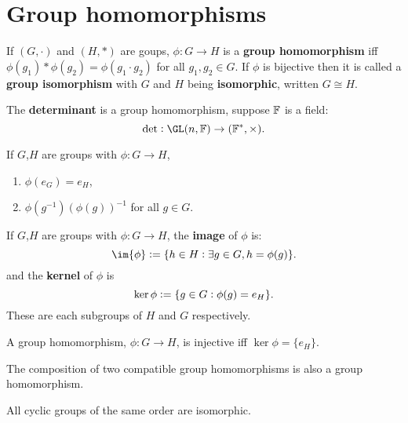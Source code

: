 \section{Group homomorphisms}

\begin{definition}
    If $(G,\cdot)$ and $(H,\ast)$ are goups, $\phi:G\rightarrow H$ is a \textbf{group homomorphism} iff $\phi(g_1)\ast\phi(g_2) = \phi(g_1\cdot g_2)$ for all $g_1,g_2\in G$. If $\phi$ is bijective then it is called a \textbf{group isomorphism} with $G$ and $H$ being \textbf{isomorphic}, written $G\cong H$.
\end{definition}

\begin{example}
    The \textbf{determinant} is a group homomorphism, suppose $\mathbb{F}$ is a field:\[
    \det: \GL(n,\FF)\rightarrow(\FF^*,\times)
    \textcolor{black}{.}
    \]
\end{example}

\begin{lemma}
    If $G$,$H$ are groups with $\phi:G\rightarrow H$, \begin{enumerate}
        \item $\phi(e_G) = e_H$,
        \item $\phi(g^{-1}) (\phi(g))^{-1}$ for all $g\in G$.
    \end{enumerate}
\end{lemma}

\begin{definition}
    If $G$,$H$ are groups with $\phi:G\rightarrow H$, the \textbf{image} of $\phi$ is: \[
        \im{\phi} := \{h\in H:\exists g\in G, h = \phi(g)\}
    \textcolor{black}{.}
    \] and the \textbf{kernel} of $\phi$ is \[
        \ker{\phi} := \{g\in G: \phi(g)=e_H\}
    \textcolor{black}{.}
    \]
    These are each subgroups of $H$ and $G$ respectively.
\end{definition}

\begin{lemma}
    A group homomorphism, $\phi:G\rightarrow H$, is injective iff $\ker\phi=\{e_H\}$.
\end{lemma}

\begin{theorem}
    The composition of two compatible group homomorphisms is also a group homomorphism.
\end{theorem}

\begin{theorem}
    All cyclic groups of the same order are isomorphic.
\end{theorem}

